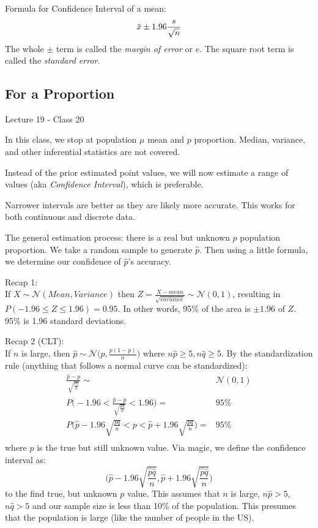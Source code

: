 \documentclass[11pt, oneside]{article}   	%
\newcommand{\overbar}[1]{\mkern 1.5mu\overline{\mkern-1.5mu#1\mkern-1.5mu}\mkern 1.5mu}
\begin{document}
Formula for Confidence Interval of a mean:
\[
\overbar{x} \pm 1.96 \frac{s}{\sqrt{n}}
\]
The whole $\pm$ term is called the \textit{margin of error} or $e$. The square root term is called the \textit{standard error}.

\subsection{For a Proportion}

Lecture 19 - Class 20

In this class, we stop at population $\mu$ mean and $p$ proportion. Median, variance, and other inferential statistics are not covered.

Instead of the prior estimated point values, we will now estimate a range of values (aka \textit{Confidence Interval}), which is preferable.

Narrower intervals are better as they are likely more accurate. This works for both continuous and discrete data. 

The general estimation process: there is a real but unknown $p$ population proportion. We take a random sample to generate $\hat{p}$. Then using a little formula, we determine our confidence of $\hat{p}$'s accuracy.

Recap 1:\\
If $X \sim \mathcal{N}(Mean, Variance)$ then $Z = \frac{X - mean} {\sqrt{variance}} \sim \mathcal{N}(0,1)$, resulting in $P(-1.96 \leq Z \leq 1.96) = 0.95$. In other words, 95\% of the area is $\pm 1.96$ of $Z$. 95\% is 1.96 standard deviations.

Recap 2 (CLT):\\
If $n$ is large, then $\hat{p} \sim \mathcal{N}\bigg( p, \frac{p(1-p)} {n} \bigg)$ where $n\hat{p} \geq 5, n\hat{q} \geq 5$. By the standardization rule (anything that follows a normal curve can be standardized):
\begin{align*}
\frac{\hat{p} - p} {\sqrt{\frac{pq}{n}}} \sim& \mathcal{N}(0,1)\\
P\bigg(-1.96 < \frac{\hat{p} - p} {\sqrt{\frac{pq}{n}}} < 1.96\bigg) =& 95\% \\
P\bigg(\hat{p} -1.96\sqrt{ \frac{pq} {n} }  < p < \hat{p} +1.96\sqrt{ \frac{pq} {n} }\bigg) =& 95\% \\
\end{align*}
where $p$ is the true but still unknown value. Via magic, we define the confidence interval as:
\[
\bigg(\hat{p} -1.96\sqrt{ \frac{\hat{p}\hat{q}} {n} }, \hat{p} +1.96\sqrt{ \frac{\hat{p}\hat{q}} {n} }\bigg) 
\]
to the find true, but unknown $p$ value. This assumes that $n$ is large, $n\hat{p} > 5$, $n\hat{q} > 5$ and our sample size is less than 10\% of the population. This presumes that the population is large (like the number of people in the US).
\end{document}
